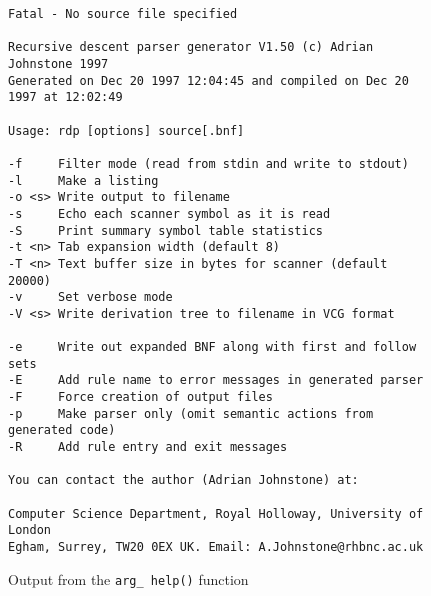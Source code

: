 \begin{figure}
{\footnotesize
\begin{verbatim}
Fatal - No source file specified

Recursive descent parser generator V1.50 (c) Adrian Johnstone 1997
Generated on Dec 20 1997 12:04:45 and compiled on Dec 20 1997 at 12:02:49

Usage: rdp [options] source[.bnf]

-f     Filter mode (read from stdin and write to stdout)
-l     Make a listing
-o <s> Write output to filename
-s     Echo each scanner symbol as it is read
-S     Print summary symbol table statistics
-t <n> Tab expansion width (default 8)
-T <n> Text buffer size in bytes for scanner (default 20000)
-v     Set verbose mode
-V <s> Write derivation tree to filename in VCG format

-e     Write out expanded BNF along with first and follow sets
-E     Add rule name to error messages in generated parser
-F     Force creation of output files
-p     Make parser only (omit semantic actions from generated code)
-R     Add rule entry and exit messages

You can contact the author (Adrian Johnstone) at:

Computer Science Department, Royal Holloway, University of London
Egham, Surrey, TW20 0EX UK. Email: A.Johnstone@rhbnc.ac.uk
\end{verbatim}
}
\caption{Output from the {\tt arg\_\,help()} function}
\label{arg:example:out}
\end{figure}
